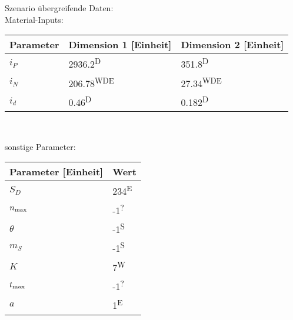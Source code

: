 \newcommand{\sourceD}{\textsuperscript{D}} %
\newcommand{\sourceW}{\textsuperscript{W}} %
\newcommand{\sourceS}{\textsuperscript{S}} %
\newcommand{\sourceE}{\textsuperscript{E}} %
\newcommand{\sourceM}{\textsuperscript{M}} %
\newcommand{\sourceL}{\textsuperscript{L}} %
\newcommand{\sourceU}{\textsuperscript{?}} %

\begin{table}
    Szenario übergreifende Daten:\\
    Material-Inputs:\\

    {\centering
    \begin{tabular}[h]{p{5cm}p{3cm}p{3cm}}
        \toprule
        Parameter & Dimension 1 [Einheit] & Dimension 2 [Einheit] \\
        \midrule
        $i_P$       &2936.2\sourceD      &351.8\sourceD\\
        $i_N$       &206.78\sourceW\sourceD\sourceE
                    &27.34\sourceW\sourceD\sourceE\\
        $i_d$       &0.46\sourceD     &0.182\sourceD\\
        \bottomrule
    \end{tabular}\\[10pt]}

    sonstige Parameter:\\

    {\centering
    \begin{tabular}[h]{p{5cm}p{5cm}}
        \toprule
        Parameter [Einheit] & Wert \\
        \midrule
        $S_D$           &234\sourceE\\
        $n_\text{max}$       &-1\sourceU\\
        $\theta$        &-1\sourceS\\
        $m_S$           &-1\sourceS\\
        $K$             &7\sourceW\\
        $t_\text{max}$       &-1\sourceU\\
        $a$             &1\sourceE\\
        \bottomrule
    \end{tabular}\\[10pt]}


\end{table}
